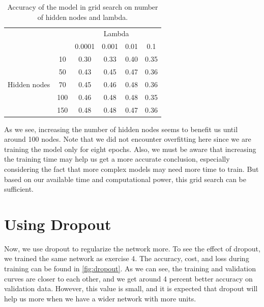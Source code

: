 \documentclass[a4paper]{article}
\begin{document}
\begin{table}[h]
	\centering
	\caption{Accuracy of the model in grid search on number of hidden nodes and lambda.}
	\label{tab:hidden}
	\begin{tabular}{|c|c|c|c|c|c|} 
		\hline
		\multicolumn{2}{|c|}{\multirow{2}{*}{}} & \multicolumn{4}{c|}{Lambda}   \\ 
		\cline{3-6}
		\multicolumn{2}{|c|}{}                  & 0.0001 & 0.001 & 0.01 & 0.1   \\ 
		\hline
		\multirow{5}{*}{Hidden nodes} & 10      & 0.30   & 0.33  & 0.40 & 0.35  \\ 
		\cline{2-6}
		& 50      & 0.43   & 0.45  & 0.47 & 0.36  \\ 
		\cline{2-6}
		& 70      & 0.45   & 0.46  & 0.48 & 0.36  \\ 
		\cline{2-6}
		& 100     & 0.46   & 0.48  & 0.48 & 0.35  \\ 
		\cline{2-6}
		& 150     & 0.48   & 0.48  & 0.47 & 0.36  \\
		\hline
	\end{tabular}
\end{table}

As we see, increasing the number of hidden nodes seems to benefit us until around 100 nodes. Note that we did not encounter overfitting here since we are training the model only for eight epochs. Also, we must be aware that increasing the training time may help us get a more accurate conclusion, especially considering the fact that more complex models may need more time to train. But based on our available time and computational power, this grid search can be sufficient.

\section{Using Dropout}

Now, we use dropout to regularize the network more. To see the effect of dropout, we trained the same network as exercise 4. The accuracy, cost, and loss during training can be found in \autoref{fig:dropout}. As we can see, the training and validation curves are closer to each other, and we get around 4 percent better accuracy on validation data. However, this value is small, and it is expected that dropout will help us more when we have a wider network with more units.
\end{document}
